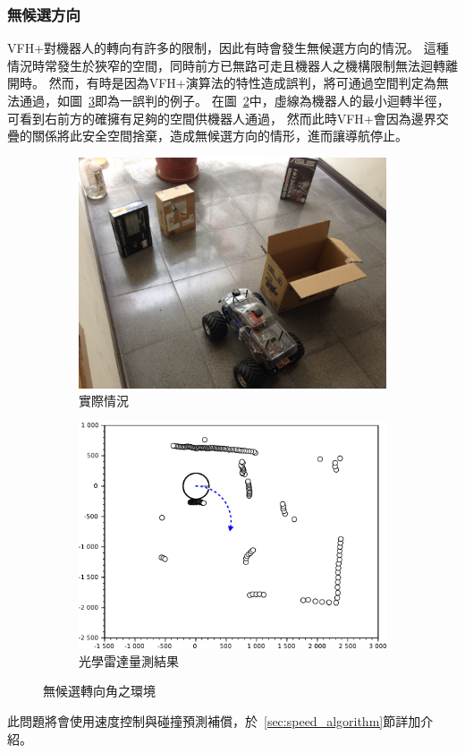 \subsubsection{無候選方向}
\label{subsubsec:no_candidate}
VFH+對機器人的轉向有許多的限制，因此有時會發生無候選方向的情況。
這種情況時常發生於狹窄的空間，同時前方已無路可走且機器人之機構限制無法迴轉離開時。
然而，有時是因為VFH+演算法的特性造成誤判，將可通過空間判定為無法通過，如圖~\ref{f:no_way_to_go}即為一誤判的例子。
在圖~\ref{f:no_way_to_go_measured}中，虛線為機器人的最小迴轉半徑，可看到右前方的確擁有足夠的空間供機器人通過，
然而此時VFH+會因為邊界交疊的關係將此安全空間捨棄，造成無候選方向的情形，進而讓導航停止。
\begin{figure}[h!]
	\centering
	\begin{subfigure}[t]{0.48\textwidth}
		\includegraphics[width=\textwidth]{figures/algorithm/NoWayToGo_Real}
		\caption{實際情況}
		\label{f:no_way_to_go_real}
	\end{subfigure}
	\begin{subfigure}[t]{0.48\textwidth}
		\includegraphics[width=\textwidth]{figures/algorithm/NoWayToGo}
		\caption{光學雷達量測結果}
		\label{f:no_way_to_go_measured}
	\end{subfigure}
	\caption{無候選轉向角之環境}
	\label{f:no_way_to_go}
\end{figure}
此問題將會使用速度控制與碰撞預測補償，於~\ref{sec:speed_algorithm}節詳加介紹。

